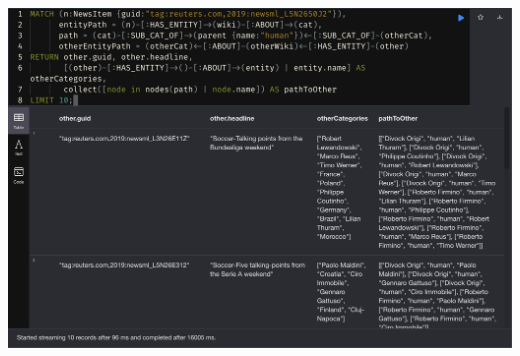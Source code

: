 \documentclass[11pt]{article}
\begin{document}
\begin{enumerate}
{    \centerline{\includegraphics[scale=0.25]{use-case-2c}}
    }
\end{enumerate}
\end{document}
